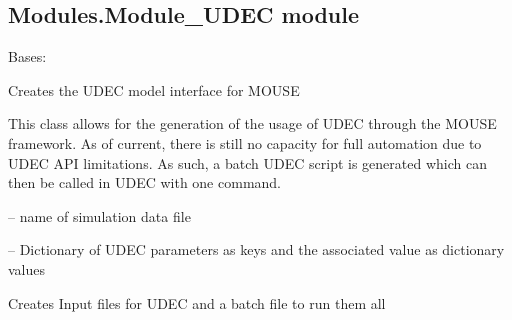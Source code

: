 \documentclass[letterpaper,10pt,english]{sphinxmanual}
\begin{document}
\subsection{Modules.Module\_UDEC module}
\label{\detokenize{MouseReferenceManual:module-Modules.Module_UDEC}}\label{\detokenize{MouseReferenceManual:modules-module-udec-module}}

\begin{fulllineitems}
\label{\detokenize{MouseReferenceManual:Modules.Module_UDEC.Module_UDEC}}
Bases: {\hyperref[\detokenize{MouseReferenceManual:Modules.Base.DemModuleBaseClass}]{}}

Creates the UDEC model interface for MOUSE

This class allows for the generation of the usage of UDEC through the MOUSE framework. As of current, there is still no capacity for full automation due to UDEC API limitations. As such, a batch UDEC script is generated which can then be called in UDEC with one command.

\begin{fulllineitems}
\label{\detokenize{MouseReferenceManual:Modules.Module_UDEC.Module_UDEC.fileName}}
 -- name of simulation data file

\end{fulllineitems}


\begin{fulllineitems}
\label{\detokenize{MouseReferenceManual:Modules.Module_UDEC.Module_UDEC.UDECParameters}}
 -- Dictionary of UDEC parameters as keys and the associated value as dictionary values

\end{fulllineitems}


\begin{fulllineitems}
\label{\detokenize{MouseReferenceManual:Modules.Module_UDEC.Module_UDEC.createInputFiles}}
Creates Input files for UDEC and a batch file to run them all


\end{fulllineitems}
\end{fulllineitems}
\end{document}

